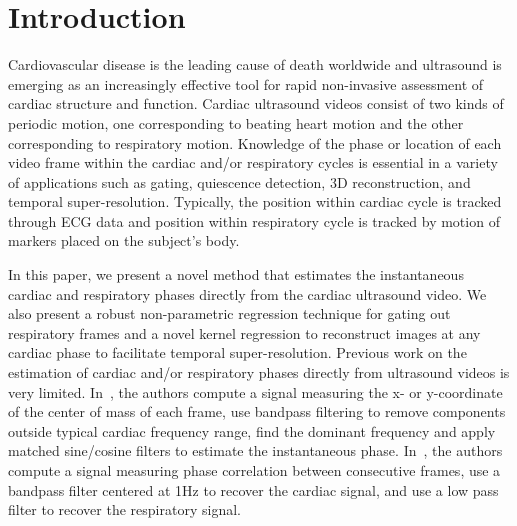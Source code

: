 \documentclass[runningheads,a4paper]{llncs}
\begin{document}
\section{Introduction}
\label{sec:intro}
%
Cardiovascular disease is the leading cause of death worldwide and ultrasound is emerging as an increasingly effective tool for rapid non-invasive assessment of cardiac structure and function. Cardiac ultrasound videos consist of two kinds of periodic motion, one corresponding to beating heart motion and the other corresponding to respiratory motion. Knowledge of the phase or location of each video frame within the cardiac and/or respiratory cycles is essential in a variety of applications such as gating\cite{VonBirgelen1997}, quiescence detection\cite{Wick2013}, 3D reconstruction\cite{Wachinger2012}, and temporal super-resolution\cite{Cherin2006}. Typically, the position within cardiac cycle is tracked through ECG data and position within respiratory cycle is tracked by motion of markers placed on the subject's body\cite{Khamene2004}. 

	In this paper, we present a novel method that estimates the instantaneous cardiac and respiratory phases directly from the cardiac ultrasound video. We also present a robust non-parametric regression technique for gating out respiratory frames and a novel kernel regression to reconstruct images at any cardiac phase to facilitate temporal super-resolution. Previous work on the estimation of cardiac and/or respiratory phases directly from ultrasound videos is very limited. In~\cite{Karadayi2006}, the authors compute a signal measuring the x- or y-coordinate of the center of mass of each frame, use bandpass filtering to remove components outside typical cardiac frequency range, find the dominant frequency and apply matched sine/cosine filters to estimate the instantaneous phase. In~\cite{Sundar2009}, the authors compute a signal measuring phase correlation between consecutive frames, use a bandpass filter centered at 1Hz to recover the cardiac signal, and use a low pass filter to recover the respiratory signal.
%
\vspace{-0.5cm}
\end{document}
